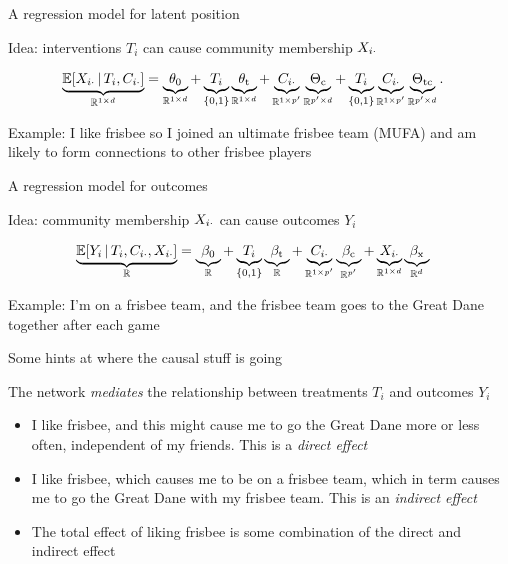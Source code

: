 \documentclass{beamer}
\theoremstyle{remark}
\begin{document}
\begin{frame}{A regression model for latent position}

    Idea: interventions $T_i$ can cause community membership $X_{i \cdot}$

    \begin{align*}
        \underbrace{\E[T_i, \C_{i \cdot}]{\X_{i \cdot}}}_{\R^{1 \times d}}
         & = \underbrace{\thetazero}_{\R^{1 \times d}}
        + \underbrace{T_i}_{\{0, 1\}} \underbrace{\thetat}_{\R^{1 \times d}}
        + \underbrace{\C_{i \cdot}}_{\R^{1 \times p'}} \underbrace{\Thetac}_{\R^{p' \times d}}
        + \underbrace{T_i}_{\{0, 1\}} \underbrace{\C_{i \cdot}}_{\R^{1 \times p'}} \underbrace{\Thetatc}_{\R^{p' \times d}}.
    \end{align*}

    Example: I like frisbee so I joined an ultimate frisbee team (MUFA) and am likely to form connections to other frisbee players

\end{frame}

\begin{frame}{A regression model for outcomes}

    Idea: community membership $X_{i \cdot}$ can cause outcomes $Y_i$

    \begin{align*}
        \underbrace{\E[T_i, \C_{i \cdot}, \X_{i \cdot}]{Y_i}}_{\R}
         & = \underbrace{\betazero}_{\R}
        + \underbrace{T_i}_{\{0, 1\}} \underbrace{\betat}_{\R}
        + \underbrace{\C_{i \cdot}}_{\R^{1 \times p'}} \underbrace{\betac}_{\R^{p'}}
        + \underbrace{\X_{i \cdot}}_{\R^{1 \times d}} \underbrace{\betax}_{\R^d}
    \end{align*}

    Example: I'm on a frisbee team, and the frisbee team goes to the Great Dane together after each game

\end{frame}

\begin{frame}{Some hints at where the causal stuff is going}

    The network \emph{mediates} the relationship between treatments $T_i$ and outcomes $Y_i$

    \begin{itemize}
        \item I like frisbee, and this might cause me to go the Great Dane more or less often, independent of my friends. This is a \emph{direct effect}
        \item I like frisbee, which causes me to be on a frisbee team, which in term causes me to go the Great Dane with my frisbee team. This is an \emph{indirect effect}
        \item The total effect of liking frisbee is some combination of the direct and indirect effect
    \end{itemize}

\end{frame}
\end{document}
